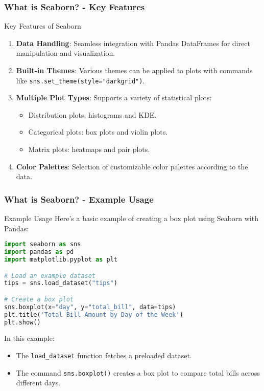 \documentclass[aspectratio=169]{beamer}
\begin{document}
\begin{frame}[fragile]
    \frametitle{What is Seaborn? - Key Features}
    \begin{block}{Key Features of Seaborn}
        \begin{enumerate}
            \item \textbf{Data Handling}: Seamless integration with Pandas DataFrames for direct manipulation and visualization.
            \item \textbf{Built-in Themes}: Various themes can be applied to plots with commands like \texttt{sns.set\_theme(style="darkgrid")}.
            \item \textbf{Multiple Plot Types}: Supports a variety of statistical plots: 
                \begin{itemize}
                    \item Distribution plots: histograms and KDE.
                    \item Categorical plots: box plots and violin plots.
                    \item Matrix plots: heatmaps and pair plots.
                \end{itemize}
            \item \textbf{Color Palettes}: Selection of customizable color palettes according to the data.
        \end{enumerate}
    \end{block}
\end{frame}

\begin{frame}[fragile]
    \frametitle{What is Seaborn? - Example Usage}
    \begin{block}{Example Usage}
        Here’s a basic example of creating a box plot using Seaborn with Pandas:
        \begin{lstlisting}[language=Python]
import seaborn as sns
import pandas as pd
import matplotlib.pyplot as plt

# Load an example dataset
tips = sns.load_dataset("tips")

# Create a box plot
sns.boxplot(x="day", y="total_bill", data=tips)
plt.title('Total Bill Amount by Day of the Week')
plt.show()
        \end{lstlisting}
        In this example:
        \begin{itemize}
            \item The \texttt{load\_dataset} function fetches a preloaded dataset.
            \item The command \texttt{sns.boxplot()} creates a box plot to compare total bills across different days.
        \end{itemize}
    \end{block}
\end{frame}
\end{document}
